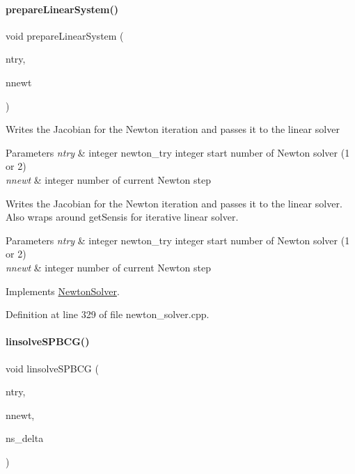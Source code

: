 \paragraph{\texorpdfstring{prepare\+Linear\+System()}{prepareLinearSystem()}}
{\footnotesize\ttfamily void prepare\+Linear\+System (\begin{DoxyParamCaption}\item[{int}]{ntry,  }\item[{int}]{nnewt }\end{DoxyParamCaption})\hspace{0.3cm}{\ttfamily [virtual]}}

Writes the Jacobian for the Newton iteration and passes it to the linear solver


\begin{DoxyParams}{Parameters}
{\em ntry} & integer newton\+\_\+try integer start number of Newton solver (1 or 2) \\
\hline
{\em nnewt} & integer number of current Newton step \\
\hline
\end{DoxyParams}
Writes the Jacobian for the Newton iteration and passes it to the linear solver. Also wraps around get\+Sensis for iterative linear solver.


\begin{DoxyParams}{Parameters}
{\em ntry} & integer newton\+\_\+try integer start number of Newton solver (1 or 2) \\
\hline
{\em nnewt} & integer number of current Newton step\\
\hline
\end{DoxyParams}


Implements \mbox{\hyperlink{classamici_1_1_newton_solver_a4aed46b0343374f171f9b4b51fa009e7}{Newton\+Solver}}.



Definition at line 329 of file newton\+\_\+solver.\+cpp.

\mbox{\label{classamici_1_1_newton_solver_iterative_a89a318e506339bc8a0d05aa01920f1ae}} 
\paragraph{\texorpdfstring{linsolve\+S\+P\+B\+C\+G()}{linsolveSPBCG()}}
{\footnotesize\ttfamily void linsolve\+S\+P\+B\+CG (\begin{DoxyParamCaption}\item[{int}]{ntry,  }\item[{int}]{nnewt,  }\item[{\mbox{\hyperlink{classamici_1_1_ami_vector}{Ami\+Vector}} $\ast$}]{ns\+\_\+delta }\end{DoxyParamCaption})}

